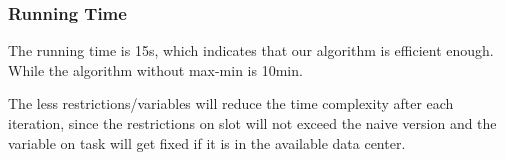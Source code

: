 \begin{frame}
\frametitle{Running Time}
The running time is 15s, which indicates that our algorithm is efficient enough. While the algorithm without max-min is 10min.

The less restrictions/variables will reduce the time complexity after each iteration, since the restrictions on slot will not exceed the naive version and the variable on task will get fixed if it is in the available data center.
\end{frame}


% 
